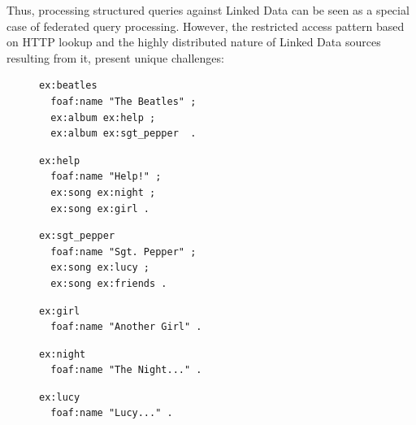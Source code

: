 Thus, processing structured queries against Linked Data can be seen as
a special case of federated query processing. However, the restricted
access pattern based on HTTP lookup and the highly distributed nature
of Linked Data sources resulting from it, present unique challenges:

\begin{figure}[ht]
  \centering
  \begin{minipage}{0.32\linewidth}
\begin{lstlisting}[breaklines=true,language=ttl,linewidth=0.98\linewidth,frame=single,caption=http://example.org/beatles]
ex:beatles 
  foaf:name "The Beatles" ;
  ex:album ex:help ;
  ex:album ex:sgt_pepper  .
\end{lstlisting}
    \vspace{-0.4cm}
  \end{minipage}
  \begin{minipage}{0.32\linewidth}
\begin{lstlisting}[breaklines=true,language=ttl,linewidth=0.98\linewidth,frame=single,caption=http://example.org/help]
ex:help 
  foaf:name "Help!" ;
  ex:song ex:night ;
  ex:song ex:girl .
\end{lstlisting}
    \vspace{-0.4cm}
  \end{minipage}
  \begin{minipage}{0.32\linewidth}
\begin{lstlisting}[breaklines=true,language=ttl,linewidth=0.98\linewidth,frame=single,caption=http://example.org/sgt\_pepper]
ex:sgt_pepper
  foaf:name "Sgt. Pepper" ;
  ex:song ex:lucy ;
  ex:song ex:friends .
\end{lstlisting}
    \vspace{-0.4cm}
  \end{minipage}
  \begin{minipage}{0.32\linewidth}
\begin{lstlisting}[breaklines=false,language=ttl,frame=single,linewidth=0.98\linewidth,caption=http://example.org/girl]
ex:girl
  foaf:name "Another Girl" .

\end{lstlisting}
  \label{fig:example}
  \end{minipage}
  \begin{minipage}{0.32\linewidth}
\begin{lstlisting}[breaklines=true,language=ttl,frame=single,linewidth=0.98\linewidth,showlines=true,caption=http://example.org/night]
ex:night 
  foaf:name "The Night..." .
\end{lstlisting}
  \end{minipage}
  \begin{minipage}{0.32\linewidth}
\begin{lstlisting}[breaklines=true,language=ttl,frame=single,showlines=true,caption=http://example.org/lucy]
ex:lucy
  foaf:name "Lucy..." .
\end{lstlisting}
  \end{minipage}


\end{figure}
